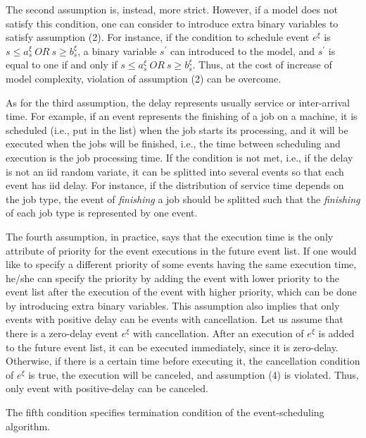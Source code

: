 \documentclass[]{interact}
\theoremstyle{plain}%
\theoremstyle{definition}
\theoremstyle{remark}
\begin{document}
The second assumption is, instead, more strict. However, if a model does not satisfy this condition, one can consider to introduce extra binary variables to satisfy assumption (2). For instance, if the condition to schedule event $e^{\xi}$ is $s\le a^{\xi}_s \ OR\ s\ge b^{\xi}_s$, a binary variable $s^{'}$ can introduced to the model, and $s^{'}$ is equal to one if and only if 
$s\le a^{\xi}_s \ OR\ s\ge b^{\xi}_s$. Thus, at the cost of increase of model complexity, violation of assumption (2) can be overcome.

As for the third assumption, the delay represents usually service or inter-arrival time. For example, if an event represents the finishing of a job on a machine, it is scheduled (i.e., put in the list) when the job starts its processing, and it will be executed when the jobs will be finished, i.e., the time between scheduling and execution is the job processing time. 
If the condition is not met, i.e., if the delay is not an iid random variate, it can be splitted into several events so that each event has iid delay. For instance, if the distribution of service time depends on the job type, the event of \textit{finishing} a job should be splitted such that the \textit{finishing} of each job type is represented by one event. 
 
The fourth assumption, in practice, says that the execution time is the only attribute of priority for the event executions in the future event list. If one would like to specify a different priority of some events having the same execution time, he/she can specify the priority by adding the event with lower priority to the event list after the execution of the event with higher priority, which can be done by introducing extra binary variables. This assumption also implies that only events with positive delay can be events with cancellation. Let us assume that there is a zero-delay event $e^{\xi}$ with cancellation. After an execution of $e^{\xi}$ is added to the future event list, it can be executed immediately, since it is zero-delay. Otherwise, if there is a certain time before executing it, the cancellation condition of $e^{\xi}$ is true, the execution will be canceled, and assumption (4) is violated. Thus,  only event with positive-delay can be canceled.

The fifth condition specifies termination condition of the event-scheduling algorithm. %
\end{document}

